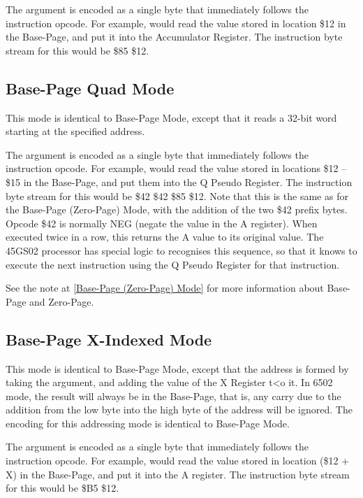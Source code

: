 The argument is encoded as a single byte that immediately follows the instruction opcode. For
example,  would read the value stored in location \$12 in the Base-Page,
and put it into the Accumulator Register.  The instruction byte stream for this would be
\$85 \$12.

\subsection{Base-Page Quad Mode}
\label{Base-Page (Zero-Page) Quad Mode}

This mode is identical to Base-Page Mode, except that it reads a 32-bit word starting at the
specified address.

The argument is encoded as a single byte that immediately follows the instruction opcode. For
example,  would read the value stored in locations \$12 -- \$15 in the Base-Page,
and put them into the Q Pseudo Register.
The instruction byte stream for this would be \$42 \$42 \$85 \$12.  Note that this is the same as for
the Base-Page (Zero-Page) Mode, with the addition of the two \$42 prefix bytes.  Opcode \$42 is normally
NEG (negate the value in the A register).  When executed twice in a row, this returns the A value to its
original value.  The 45GS02 processor has special logic to recognises this sequence, so that it knows
to execute the next instruction using the Q Pseudo Register for that instruction.

See the note at \ref{Base-Page (Zero-Page) Mode} for more information about Base-Page and Zero-Page.

\subsection{Base-Page X-Indexed Mode}

This mode is identical to Base-Page Mode, except that the address is formed by taking the
argument, and adding the value of the X Register t<o it.  In 6502 mode, the result will always
be in the Base-Page, that is, any carry due to the addition from the low byte into the high byte
of the address will be ignored.  The encoding for this addressing mode is identical to Base-Page
Mode.

The argument is encoded as a single byte that immediately follows the instruction opcode.
For example,  would read the value stored in location (\$12 + X) in the Base-Page,
and put it into the A register.  The instruction byte stream for this would be \$B5 \$12.

